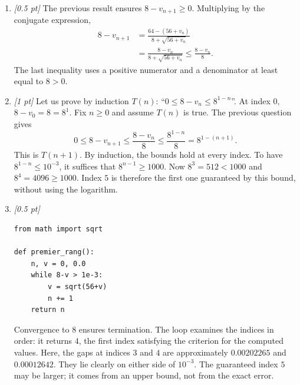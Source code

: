 \begin{enumerate}
\item \textit{[0.5 pt]} The previous result ensures $8-v_{n+1}\ge0$. Multiplying by the conjugate expression,
\[\begin{aligned}8-v_{n+1}&=\frac{64-(56+v_n)}{8+\sqrt{56+v_n}}\\&=\frac{8-v_n}{8+\sqrt{56+v_n}}\le\frac{8-v_n}{8}.\end{aligned}\]
The last inequality uses a positive numerator and a denominator at least equal to $8>0$.

\item \textit{[1 pt]} Let us prove by induction $T(n)$: ``$0\le 8-v_n\le 8^{1-n}$''.
At index $0$, $8-v_0=8=8^1$. Fix $n\ge0$ and assume $T(n)$ is true. The previous question gives
\[0\le 8-v_{n+1}\le\frac{8-v_n}{8}\le\frac{8^{1-n}}{8}=8^{1-(n+1)}.\]
This is $T(n+1)$. By induction, the bounds hold at every index.
To have $8^{1-n}\le10^{-3}$, it suffices that $8^{n-1}\ge1000$.
Now $8^{3}=512<1000$ and $8^{4}=4096\ge1000$. Index $5$ is therefore the first one guaranteed by this bound, without using the logarithm.


\item \textit{[0.5 pt]} 
\begin{lstlisting}
from math import sqrt

def premier_rang():
    n, v = 0, 0.0
    while 8-v > 1e-3:
        v = sqrt(56+v)
        n += 1
    return n
\end{lstlisting}
Convergence to $8$ ensures termination. The loop examines the indices in order: it returns $4$, the first index satisfying the criterion for the computed values. Here, the gaps at indices $3$ and $4$ are approximately $0.00202265$ and $0.00012642$. They lie clearly on either side of $10^{-3}$. The guaranteed index $5$ may be larger; it comes from an upper bound, not from the exact error.

\end{enumerate}


